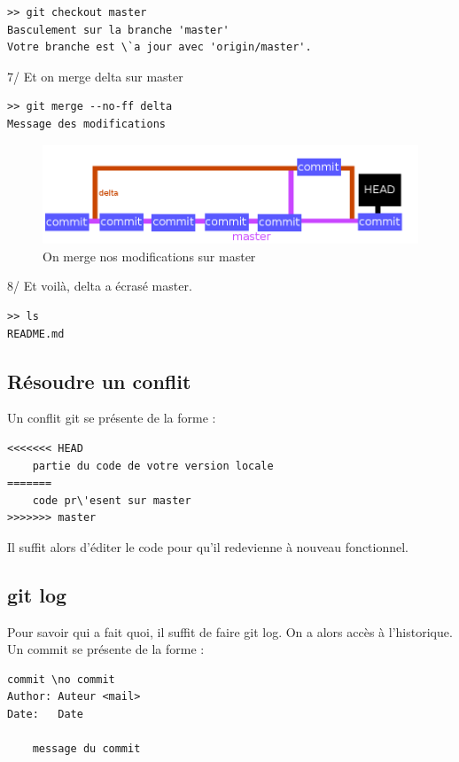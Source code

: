 \documentclass[a4paper,10pt]{report}
\begin{document}
\begin{verbatim}
>> git checkout master
Basculement sur la branche 'master'
Votre branche est \`a jour avec 'origin/master'.
\end{verbatim}
    7/ Et on merge delta sur master
\begin{verbatim}
>> git merge --no-ff delta 
Message des modifications
\end{verbatim}
\begin{figure}[h!]
  \begin{center}
    \includegraphics[scale=0.3]{images/6exp}
    \caption{On merge nos modifications sur master}
    \label{6exp}
  \end{center}
\end{figure}
    8/ Et voil\`a, delta a \'ecras\'e master.
\begin{verbatim}
>> ls
README.md
\end{verbatim}


     \subsection{R\'esoudre un conflit}
     Un conflit git se pr\'esente de la forme :
\begin{verbatim}
<<<<<<< HEAD
    partie du code de votre version locale
=======
    code pr\'esent sur master
>>>>>>> master
\end{verbatim}
		Il suffit alors d'\'editer le code pour qu'il redevienne \`a nouveau fonctionnel.
     \subsection{git log}
     Pour savoir qui a fait quoi, il suffit de faire git log. On a alors acc\`es \`a l'historique. Un commit se pr\'esente de la forme : 
\begin{verbatim}
commit \no commit
Author: Auteur <mail>
Date:   Date

    message du commit
\end{verbatim}
\end{document}
